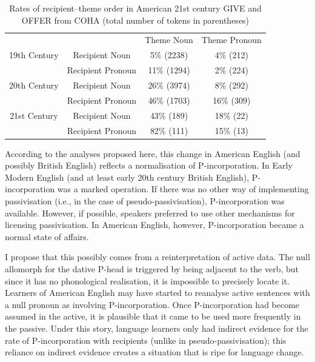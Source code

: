 	\begin{table}
		\begin{tabular}{cccc}
	&			&	Theme Noun	&	Theme Pronoun\\
19th Century& Recipient Noun	&	5\% (2238)	&	4\% (212)\\
	& Recipient Pronoun	&	11\% (1294)	&	2\% (224)\\
20th Century& Recipient Noun	&	26\% (3974)	&	8\% (292)\\
	& Recipient Pronoun	&	46\% (1703)	&	16\% (309)\\
21st Century& Recipient Noun	&	43\% (189)	&	18\% (22)\\
	& Recipient Pronoun	&	82\% (111)	&	15\% (13)\\
		\end{tabular}
		\caption{Rates of recipient--theme order in American 21st century GIVE and OFFER from COHA (total number of tokens in parentheses)}
		\label{tab:am-rec-rates}
	\end{table}

	According to the analyses proposed here, this change in American English (and possibly British English) reflects a normalisation of P-incorporation. In Early Modern English (and at least early 20th century British English), P-incorporation was a marked operation. If there was no other way of implementing passivisation (i.e., in the case of pseudo-passivisation), P-incorporation was available. However, if possible, speakers preferred to use other mechanisms for licensing passivisation. In American English, however, P-incorporation became a normal state of affairs. 
	
	I propose that this possibly comes from a reinterpretation of active data. The null allomorph for the dative P-head is triggered by being adjacent to the verb, but since it has no phonological realisation, it is impossible to precisely locate it. Learners of American English may have started to reanalyse active sentences with a null pronoun as involving P-incorporation. Once P-incorporation had become assumed in the active, it is plausible that it came to be used more frequently in the passive. Under this story, language learners only had indirect evidence for the rate of P-incorporation with recipients (unlike in pseudo-passivisation); this reliance on indirect evidence creates a situation that is ripe for language change.

